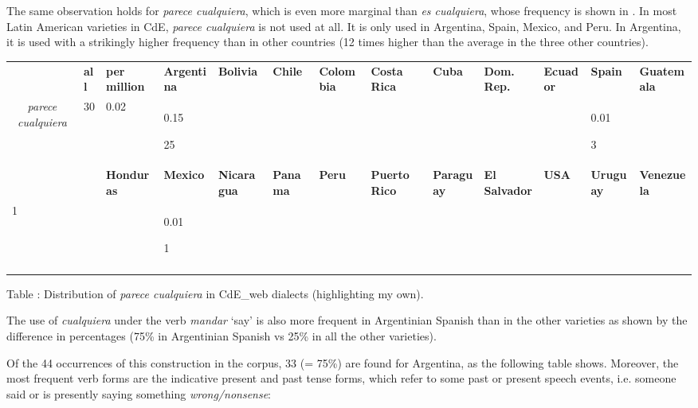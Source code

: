 \documentclass[output=paper]{langscibook}
\begin{document}
  The same observation holds for \textit{parece cualquiera}, which is even more marginal than \textit{es cualquiera}, whose frequency is shown in . In most Latin American varieties in CdE, \textit{parece cualquiera} is not used at all. It is only used in Argentina, Spain, Mexico, and Peru. In Argentina, it is used with a strikingly higher frequency than in other countries (12 times higher than the average in the three other countries).


\begin{tabularx}{\textwidth}{XXXXXXXXXXXXX}

\lsptoprule

\multicolumn{1}{c}{\textbf{context}} & \textbf{all} & \textbf{per} \textbf{million} & \textbf{Argentina} & \textbf{Bolivia} & \textbf{Chile} & \textbf{Colombia} & \textbf{Costa} \textbf{Rica} & \textbf{Cuba} & \textbf{Dom.} \textbf{Rep.} & \textbf{Ecuador} & \textbf{Spain} & \textbf{Guatemala}\\
\multicolumn{1}{c}{ \textit{parece cualquiera}} & 30 & 0.02 & { 0.15}

 25 &  &  &  &  &  &  &  & { 0.01}

 3 & \\
&  & \textbf{Honduras} & \textbf{Mexico} & \textbf{Nicaragua} & \textbf{Panama} & \textbf{Peru} & \textbf{Puerto} \textbf{Rico} & \textbf{Paraguay} & \textbf{El} \textbf{Salvador} & \textbf{USA} & \textbf{Uruguay} & \textbf{Venezuela}\\

 1 &  &  & { 0.01}

 1 &  &  &  &  &  & \\
\lspbottomrule
\end{tabularx}
\begin{styletablecaption}
Table : Distribution of \textit{parece cualquiera} in CdE\_web dialects (highlighting my own).
\end{styletablecaption}

The use of \textit{cualquiera} under the verb \textit{mandar} ‘say’ is also more frequent in Argentinian Spanish than in the other varieties as shown by the difference in percentages (75\% in Argentinian Spanish vs 25\% in all the other varieties).

  Of the 44 occurrences of this construction in the corpus, 33 (= 75\%) are found for Argentina, as the following table shows. Moreover, the most frequent verb forms are the indicative present and past tense forms, which refer to some past or present speech events, i.e. someone said or is presently saying something \textit{wrong/nonsense}:
\end{document}
